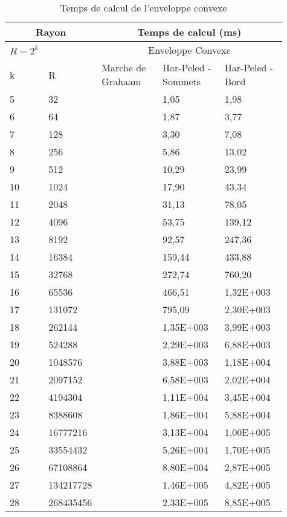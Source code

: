 \begin{table}[h!]
  \begin{tabular}{|p{0.09\linewidth}|p{0.13\linewidth}||p{0.23\linewidth}|p{0.23\linewidth}|p{0.23\linewidth}|}
    \hline
    \multicolumn{2}{|c||}{Rayon} & \multicolumn{3}{c|}{Temps de calcul (ms) } \\  \hline 
    $R=2^k$  &  &  \multicolumn{3}{c|}{Enveloppe Convexe}  \\ \hline
    k & R & Marche de Grahaam & Har-Peled - Sommets & Har-Peled - Bord \\
    \hline
    5 & 32 &  & 1,05 & 1,98\\
    6 & 64 &  & 1,87 & 3,77\\
    7 & 128 &  & 3,30 & 7,08\\
    8 & 256 &  & 5,86 & 13,02\\
    9 & 512 &  & 10,29 & 23,99\\
    10 & 1024 &  & 17,90 & 43,34\\
    11 & 2048 &  & 31,13 & 78,05\\
    12 & 4096 &  & 53,75 & 139,12\\
    13 & 8192 &  & 92,57 & 247,36\\
    14 & 16384 &  & 159,44 & 433,88\\
    15 & 32768 &  & 272,74 & 760,20\\
    16 & 65536 &  & 466,51 & 1,32E+003\\
    17 & 131072 &  & 795,09 & 2,30E+003\\
    18 & 262144 &  & 1,35E+003 & 3,99E+003\\
    19 & 524288 &  & 2,29E+003 & 6,88E+003\\
    20 & 1048576 &  & 3,88E+003 & 1,18E+004\\
    21 & 2097152 &  & 6,58E+003 & 2,02E+004\\
    22 & 4194304 &  & 1,11E+004 & 3,45E+004\\
    23 & 8388608 &  & 1,86E+004 & 5,88E+004\\
    24 & 16777216 &  & 3,13E+004 & 1,00E+005\\
    25 & 33554432 &  & 5,26E+004 & 1,70E+005\\
    26 & 67108864 &  & 8,80E+004 & 2,87E+005\\
    27 & 134217728 &  & 1,46E+005 & 4,82E+005\\
    28 & 268435456 &  & 2,33E+005 & 8,85E+005\\

    \hline
  \end{tabular} 
  \caption{Temps de calcul de l'enveloppe convexe}
\end{table}




